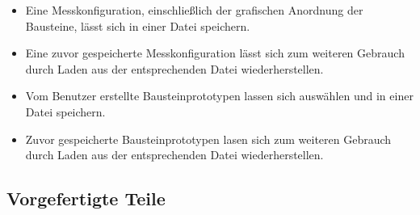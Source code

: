 \documentclass[parskip=full]{scrartcl}
\begin{document}
\begin{itemize}
		
	\item 
	\begin{MussKrit} 			
		Eine Messkonfiguration, einschließlich der grafischen Anordnung der Bausteine, lässt sich in einer Datei speichern.
	\end{MussKrit}
	
	\item 
	\begin{MussKrit} 			
		Eine zuvor gespeicherte Messkonfiguration lässt sich zum weiteren Gebrauch durch Laden aus der entsprechenden Datei wiederherstellen. 
	\end{MussKrit}
	
	\item 
	\begin{SollKrit} 
		Vom Benutzer erstellte Bausteinprototypen lassen sich auswählen und in einer Datei speichern.			
	\end{SollKrit}
	
	\item 
	\begin{SollKrit} 			
		Zuvor gespeicherte Bausteinprototypen lasen sich zum weiteren Gebrauch durch Laden aus der entsprechenden Datei wiederherstellen. 
	\end{SollKrit}
	
\end{itemize}

\subsection {Vorgefertigte Teile}
\end{document}
